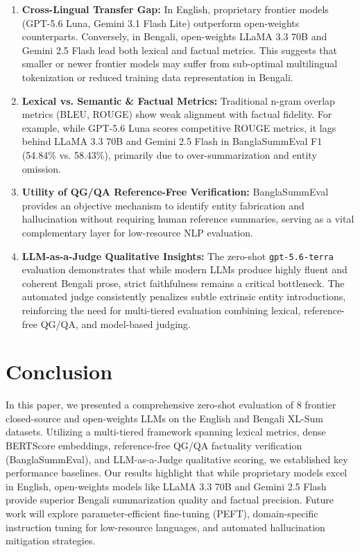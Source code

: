 \documentclass[runningheads]{llncs}
\begin{document}
\begin{enumerate}
    \item \textbf{Cross-Lingual Transfer Gap:} In English, proprietary frontier models (GPT-5.6 Luna, Gemini 3.1 Flash Lite) outperform open-weights counterparts. Conversely, in Bengali, open-weights LLaMA 3.3 70B and Gemini 2.5 Flash lead both lexical and factual metrics. This suggests that smaller or newer frontier models may suffer from sub-optimal multilingual tokenization or reduced training data representation in Bengali.
    \item \textbf{Lexical vs. Semantic \& Factual Metrics:} Traditional n-gram overlap metrics (BLEU, ROUGE) show weak alignment with factual fidelity. For example, while GPT-5.6 Luna scores competitive ROUGE metrics, it lags behind LLaMA 3.3 70B and Gemini 2.5 Flash in BanglaSummEval F1 (54.84\% vs. 58.43\%), primarily due to over-summarization and entity omission.
    \item \textbf{Utility of QG/QA Reference-Free Verification:} BanglaSummEval provides an objective mechanism to identify entity fabrication and hallucination without requiring human reference summaries, serving as a vital complementary layer for low-resource NLP evaluation.
    \item \textbf{LLM-as-a-Judge Qualitative Insights:} The zero-shot \texttt{gpt-5.6-terra} evaluation demonstrates that while modern LLMs produce highly fluent and coherent Bengali prose, strict faithfulness remains a critical bottleneck. The automated judge consistently penalizes subtle extrinsic entity introductions, reinforcing the need for multi-tiered evaluation combining lexical, reference-free QG/QA, and model-based judging.
\end{enumerate}

%
%
\section{Conclusion}\label{sec:conclusions}

In this paper, we presented a comprehensive zero-shot evaluation of 8 frontier closed-source and open-weights LLMs on the English and Bengali XL-Sum datasets. Utilizing a multi-tiered framework spanning lexical metrics, dense BERTScore embeddings, reference-free QG/QA factuality verification (BanglaSummEval), and LLM-as-a-Judge qualitative scoring, we established key performance baselines. Our results highlight that while proprietary models excel in English, open-weights models like LLaMA 3.3 70B and Gemini 2.5 Flash provide superior Bengali summarization quality and factual precision. Future work will explore parameter-efficient fine-tuning (PEFT), domain-specific instruction tuning for low-resource languages, and automated hallucination mitigation strategies.
\end{document}
